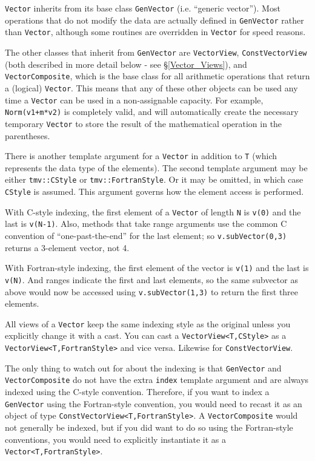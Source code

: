 \documentclass[twoside,letterpaper,11pt]{article}
\renewcommand{\tt}[1]{{\lstinline {#1}}}
\begin{document}
\tt{Vector} inherits from its base class \tt{GenVector} (i.e. ``generic vector'').
Most operations that do not 
modify the data are actually defined in \tt{GenVector} rather than \tt{Vector}, although
some routines are overridden in \tt{Vector} for speed reasons.  

The other classes that inherit from \tt{GenVector} are \tt{VectorView}, 
\tt{ConstVectorView} (both described in more detail below - see \S\ref{Vector_Views}), and
\tt{VectorComposite}, which is the base class for all arithmetic operations that
return a (logical) \tt{Vector}.  This means that any of these other objects can be used
any time a \tt{Vector} can be used in a non-assignable capacity.  For example,
\tt{Norm(v1+m*v2)} is completely valid, and will automatically create the necessary
temporary \tt{Vector} to store the result of the mathematical operation in the parentheses.

There is another template argument for a \tt{Vector} in addition to \tt{T} (which
represents the data type of the elements).  The second template argument
may be either \tt{tmv::CStyle} or \tt{tmv::FortranStyle}.  Or it may be omitted,
in which case \tt{CStyle} is assumed.  This argument governs how the element
access is performed.

With C-style indexing, the first element of a \tt{Vector} of length \tt{N} is 
\tt{v(0)} and the last is \tt{v(N-1)}.  Also, methods that take range arguments
use the common C convention of ``one-past-the-end'' for the last element;
so \tt{v.subVector(0,3)} returns a 3-element vector, not 4.

With Fortran-style indexing, the first element of the vector is \tt{v(1)} and the 
last is \tt{v(N)}.  And ranges indicate the first and last elements, so the same
subvector as above would now be accessed using \tt{v.subVector(1,3)} to return
the first three elements.

All views of a \tt{Vector} keep the same indexing style as the original unless you
explicitly change it with a cast.  You can cast a \tt{VectorView<T,CStyle>} as
a \tt{VectorView<T,FortranStyle>} and vice versa.  Likewise for
\tt{ConstVectorView}.  

The only thing to watch out for about the indexing is that \tt{GenVector}
and \tt{VectorComposite} do not have the extra \tt{index} 
template argument and are always
indexed using the C-style convention.  Therefore, 
if you want to index a \tt{GenVector}
using the Fortran-style convention, you would need to recast it
as an object of type
\tt{ConstVectorView<T,FortranStyle>}.  A \tt{VectorComposite} would 
not generally be indexed, but if you did want to do so using the 
Fortran-style conventions, you would need to explicitly instantiate it
as a \tt{Vector<T,FortranStyle>}.
\end{document}
